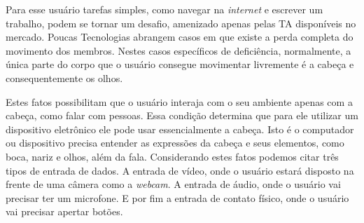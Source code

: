 Para esse usuário tarefas simples, como navegar na \textit{internet} e escrever um trabalho, podem se tornar um desafio, amenizado apenas pelas TA disponíveis no mercado. Poucas Tecnologias abrangem casos em que existe a perda completa do movimento dos membros. Nestes casos específicos de deficiência, normalmente, a única parte do corpo que o usuário consegue movimentar livremente é a cabeça e consequentemente os olhos.

Estes fatos possibilitam que o usuário interaja com o seu ambiente apenas com a cabeça, como falar com pessoas. Essa condição determina que para ele utilizar um dispositivo eletrônico ele pode usar essencialmente a cabeça. Isto é o computador ou dispositivo precisa entender as expressões da cabeça e seus elementos, como boca, nariz e olhos, além da fala. Considerando estes fatos podemos citar três tipos de entrada de dados. A entrada de vídeo, onde o usuário estará disposto na frente de uma câmera como a \textit{webcam}. A entrada de áudio, onde o usuário vai precisar ter um microfone. E por fim a entrada de contato físico, onde o usuário vai precisar apertar botões.

% 
% 

% 
% 

